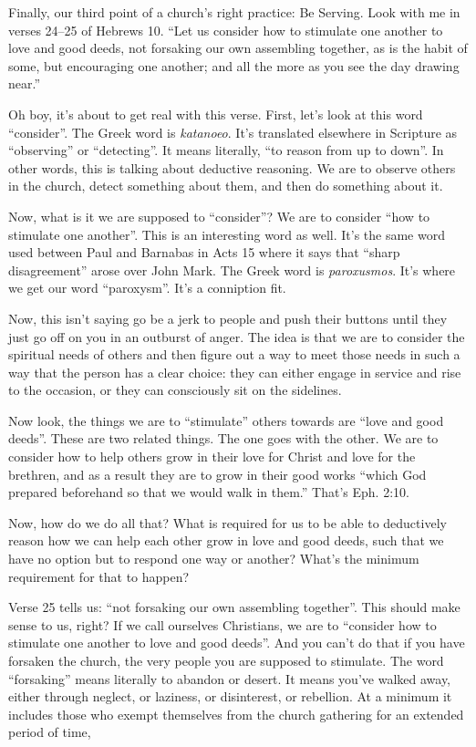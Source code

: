 \documentclass[letterpaper, 12pt]{article}
\begin{document}
    Finally, our third point of a church's right practice: Be Serving.
    Look with me in verses 24--25 of Hebrews 10. ``Let us consider how
    to stimulate one another to love and good deeds, not forsaking our
    own assembling together, as is the habit of some, but encouraging
    one another; and all the more as you see the day drawing near.''

    Oh boy, it's about to get real with this verse. First, let's look at
    this word ``consider''. The Greek word is \emph{katanoeo}. It's
    translated elsewhere in Scripture as ``observing'' or ``detecting''.
    It means literally, ``to reason from up to down''. In other words,
    this is talking about deductive reasoning. We are to observe others
    in the church, detect something about them, and then do something
    about it.

    Now, what is it we are supposed to ``consider''? We are to consider
    ``how to stimulate one another''. This is an interesting word as
    well. It's the same word used between Paul and Barnabas in Acts 15
    where it says that ``sharp disagreement'' arose over John Mark. The
    Greek word is \emph{paroxusmos}. It's where we get our word
    ``paroxysm''. It's a conniption fit.

    Now, this isn't saying go be a jerk to people and push their buttons
    until they just go off on you in an outburst of anger. The idea is
    that we are to consider the spiritual needs of others and then
    figure out a way to meet those needs in such a way that the person
    has a clear choice: they can either engage in service and rise to
    the occasion, or they can consciously sit on the sidelines.

    Now look, the things we are to ``stimulate'' others towards are
    ``love and good deeds''. These are two related things. The one goes
    with the other. We are to consider how to help others grow in their
    love for Christ and love for the brethren, and as a result they are
    to grow in their good works ``which God prepared beforehand so that
    we would walk in them.'' That's Eph. 2:10.

    Now, how do we do all that? What is required for us to be able to
    deductively reason how we can help each other grow in love and good
    deeds, such that we have no option but to respond one way or
    another? What's the minimum requirement for that to happen?

    Verse 25 tells us: ``not forsaking our own assembling together''.
    This should make sense to us, right? If we call ourselves
    Christians, we are to ``consider how to stimulate one another to
    love and good deeds''. And you can't do that if you have forsaken
    the church, the very people you are supposed to stimulate. The word
    ``forsaking'' means literally to abandon or desert. It means you've
    walked away, either through neglect, or laziness, or disinterest, or
    rebellion. At a minimum it includes those who exempt themselves from
    the church gathering for an extended period of time,
\end{document}
